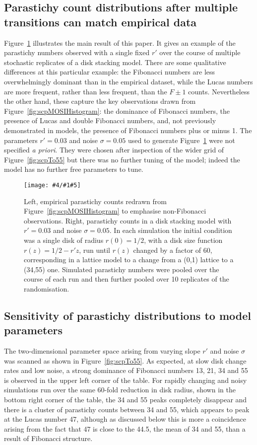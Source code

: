 \documentclass[a4paper,10pt]{amsart}
\newlength{\jfigwidth}
\newcommand{\pdffig}[3]{\jdofig{#1}{#2}{#3}{Figures}{.pdf}}
\newcommand{\jdofig}[5]{
	\begin{figure}\centering\texttt{[image: \#4/\#1\#5]} \caption{#2}\label{fig:#1}\end{figure}
}
\begin{document}
\clearpage

\subsection{Parastichy count distributions after multiple transitions can match empirical data}
Figure~\ref{fig:scpAhaPair} illustrates the main result of this paper. It gives an example of the parastichy numbers observed with a single fixed $r'$ over the course of multiple stochastic replicates of a disk stacking model.    There are some qualitative differences at this particular example: the Fibonacci numbers are less overwhelmingly dominant than in the empirical dataset, while the Lucas numbers are more frequent, rather than less frequent, than the $F\pm1$ counts. Nevertheless the other hand, these capture the key observations drawn from  Figure~\ref{fig:scpMOSIHistogram}: the dominance of Fibonacci numbers, the  presence of Lucas and double Fibonacci numbers, and,  not previously demonstrated in models, the presence of Fibonacci numbers plus or minus 1. 
The parameters $r'=0.03$ and noise $\sigma=0.05$ used to generate Figure~\ref{fig:scpAhaPair} were not specified \textit{a priori}. They were chosen after inspection of the wider grid of Figure~\ref{fig:scpTo55} but there was no further tuning of the model;  indeed the model has no further free parameters to tune.

\pdffig{scpAhaPair}{Left, empirical parastichy counts redrawn from Figure~\ref{fig:scpMOSIHistogram} to emphasise non-Fibonacci observations. Right,  parastichy counts in a disk stacking model with $r'=0.03$ and noise $\sigma=0.05$. In each simulation the initial condition was a single disk of radius $r(0)=1/2$, with a disk size function $r(z)=1/2- r'z$, run until $r(z)$ changed by a factor of  60, corresponding in a lattice model to a change from a (0,1) lattice to a (34,55) one. 
	Simulated parastichy numbers were pooled over the course of each run and then further pooled over 10 replicates of the randomisation. }{1}

\subsection{Sensitivity of parastichy distributions to model parameters}

The two-dimensional parameter space arising from varying slope $r'$ and noise $\sigma$ was scanned as shown in  Figure~\ref{fig:scpTo55}. As expected, at slow disk change rates and low noise, a strong dominance of Fibonacci numbers 13, 21, 34 and 55 is observed in the upper left corner of the table. For rapidly changing and noisy simulations run over the same 60-fold reduction in disk radius, shown in the bottom right corner of the table, the 34 and 55 peaks completely disappear and there is a cluster of parastichy counts between 34 and 55, which appears to peak at the Lucas number 47, although as discussed below this is more a coincidence arising from the fact that 47 is close to the 44.5, the mean of 34 and 55, than a result of Fibonacci structure. 
\end{document}
